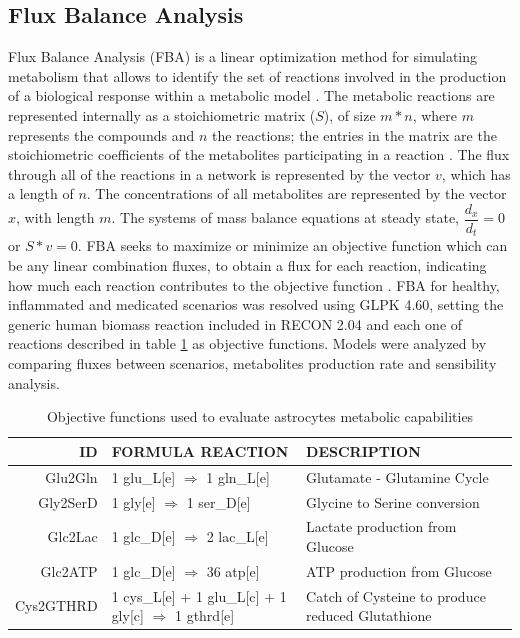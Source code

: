 \subsection{Flux Balance Analysis}
Flux Balance Analysis (FBA) is a linear optimization method for simulating metabolism that allows to identify the set of reactions involved in the production of a biological response within a metabolic model \cite{Orth2010}. The metabolic reactions are represented internally as a stoichiometric matrix ($S$), of size $m * n$, where $m$ represents the compounds and $n$ the reactions; the entries in the matrix are the stoichiometric coefficients of the metabolites participating in a reaction \cite{Raman2009}. The flux through all of the reactions in a network is represented by the vector $v$, which has a length of $n$. The concentrations of all metabolites are represented by the vector $x$, with length $m$. The systems of mass balance equations at steady state, $\dfrac{d_{x}}{d_{t}}=0$ or $S * v = 0$. FBA seeks to maximize or minimize an objective function which can be any linear combination fluxes, to obtain a flux for each reaction, indicating how much each reaction contributes to the objective function \cite{Orth2010}. FBA for healthy, inflammated and medicated scenarios was resolved using GLPK 4.60, setting the generic human biomass reaction included in RECON 2.04 and each one of reactions described in table \ref{OF} as objective functions. Models were analyzed by comparing fluxes between scenarios, metabolites production rate and sensibility analysis.

\begin{table}[h]
\caption{Objective functions used to evaluate astrocytes metabolic capabilities}
\label{OF}
\begin{center}
\footnotesize{
\begin{tabular}{rlp{6cm}}
\hline
ID & FORMULA REACTION & DESCRIPTION \\
\hline
\hline
Glu2Gln & 1 glu\_L[e] $\Rightarrow$ 1 gln\_L[e] & Glutamate - Glutamine Cycle \\
Gly2SerD & 1 gly[e] $\Rightarrow$ 1 ser\_D[e] & Glycine to Serine conversion\\
Glc2Lac & 1 glc\_D[e] $\Rightarrow$ 2 lac\_L[e]& Lactate production from Glucose \\
Glc2ATP & 1 glc\_D[e] $\Rightarrow$ 36 atp[e] & ATP production from Glucose \\
Cys2GTHRD&1 cys\_L[e] + 1 glu\_L[c] + 1 gly[c] $\Rightarrow$ 1 gthrd[e]& Catch of Cysteine to produce reduced Glutathione \\
\hline
\end{tabular}}
\end{center}
\end{table} 
